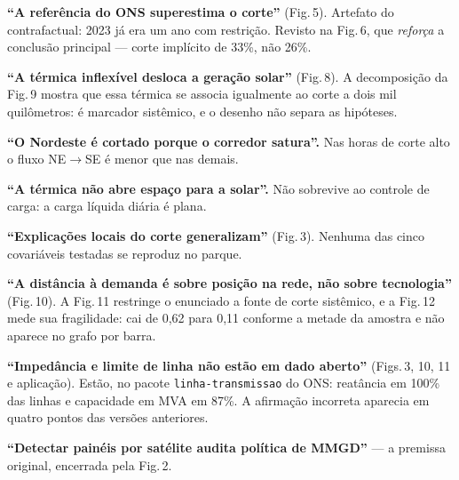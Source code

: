 \documentclass[10pt]{article}
\newcommand{\bloco}[1]{\vspace{2pt}{\color{vermelho}\footnotesize\textbf{#1}}\par\vspace{-2pt}}
\begin{document}
\begin{minipage}[t]{0.315\linewidth}\vspace{0pt}\small
\bloco{Conclusões revisadas}
\textbf{``A referência do ONS superestima o corte''} (Fig.\,5). Artefato do
contrafactual: 2023 já era um ano com restrição. Revisto na Fig.\,6, que \textit{reforça}
a conclusão principal --- corte implícito de 33\%, não 26\%.

\textbf{``A térmica inflexível desloca a geração solar''} (Fig.\,8). A decomposição da
Fig.\,9 mostra que essa térmica se associa igualmente ao corte a dois mil quilômetros:
é marcador sistêmico, e o desenho não separa as hipóteses.

\textbf{``O Nordeste é cortado porque o corredor satura''.} Nas horas de corte alto o
fluxo NE$\rightarrow$SE é menor que nas demais.

\textbf{``A térmica não abre espaço para a solar''.} Não sobrevive ao controle de carga:
a carga líquida diária é plana.

\textbf{``Explicações locais do corte generalizam''} (Fig.\,3). Nenhuma das cinco
covariáveis testadas se reproduz no parque.

\textbf{``A distância à demanda é sobre posição na rede, não sobre tecnologia''}
(Fig.\,10). A Fig.\,11 restringe o enunciado a fonte de corte sistêmico, e a Fig.\,12
mede sua fragilidade: cai de 0,62 para 0,11 conforme a metade da amostra e não aparece
no grafo por barra.

\textbf{``Impedância e limite de linha não estão em dado aberto''} (Figs.\,3, 10, 11 e
aplicação). Estão, no pacote \texttt{linha-transmissao} do ONS: reatância em 100\% das
linhas e capacidade em MVA em 87\%. A afirmação incorreta aparecia em quatro pontos das
versões anteriores.

\textbf{``Detectar painéis por satélite audita política de MMGD''} --- a premissa
original, encerrada pela Fig.\,2.
\end{minipage}\hfill
\end{document}
